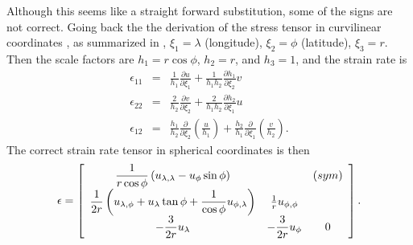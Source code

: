 \documentclass[11pt]{report}
\begin{document}
Although this seems like a straight forward substitution, some of the signs are not correct.  Going back the the derivation of the stress tensor in curvilinear coordinates \cite[Appendix 2]{Batchelor67book}, as summarized in \cite[Section 2b]{Hunke_Dukowicz02mwr}, $\xi_1=\lambda$ (longitude), $\xi_2=\phi$ (latitude), $\xi_3=r$.  Then the scale factors are $h_1=r \cos\phi$, $h_2=r$, and $h_3=1$, and the strain rate is 
\begin{eqnarray}
\epsilon_{11}&=&\frac{1}{h_1} \frac{\partial u}{\partial \xi_1} + \frac{1}{h_1 h_2}\frac{\partial h_1}{\partial \xi_2} v \\
\epsilon_{22}&=&\frac{2}{h_2} \frac{\partial v}{\partial \xi_2} + \frac{2}{h_1 h_2}\frac{\partial h_2}{\partial \xi_1} u \\
\epsilon_{12}&=&\frac{h_1}{h_2} \frac{\partial }{\partial \xi_2}\left(\frac{u}{h_1}\right) 
           + \frac{h_2}{h_1} \frac{\partial }{\partial \xi_1}\left(\frac{v}{h_2}\right).
\end{eqnarray}
The correct strain rate tensor in spherical coordinates is then
\begin{eqnarray}
\epsilon = \left[\begin{array}{ccc}
\displaystyle
\frac{1}{r\cos\phi} \left( u_{\lambda,\lambda} -  u_\phi\sin\phi \right) &  & (sym) \\
\displaystyle
\frac{1}{2r}\left(u_{\lambda,\phi} + u_\lambda \tan\phi  +  \frac{1}{\cos\phi}u_{\phi,\lambda}  \right)
\displaystyle
   & \frac{1}{r} u_{\phi,\phi}  & \\
\displaystyle
 - \frac{3}{2r}u_\lambda &  
\displaystyle
 - \frac{3}{2r}u_\phi  & 0
\end{array}\right].
\end{eqnarray}
\end{document}
